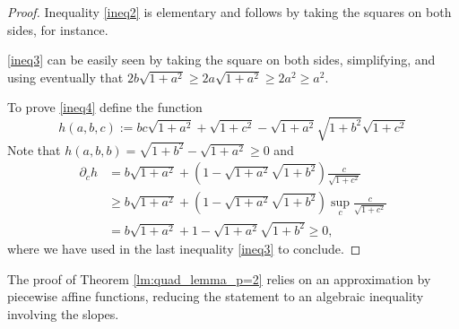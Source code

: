 \documentclass[10pt,leqno]{amsart}
\newcommand{\p}{\partial}
\numberwithin{Theorem}{section}
\theoremstyle{definition}
\theoremstyle{remark}
\numberwithin{equation}{section}
\numberwithin{equation}{section}
\begin{document}
\begin{proof}
Inequality \eqref{ineq2} is elementary and follows by taking the squares on both sides, for instance.

\eqref{ineq3} can be easily seen by taking the square on both sides, simplifying, and using eventually  that $2b\sqrt{1+a^2}\geq 2a\sqrt{1+a^2}\geq 2a^2\geq a^2.$

To prove \eqref{ineq4} define the function
\[
h(a,b,c):= bc \sqrt{1+a^2} +\sqrt{1+c^2}-\sqrt{1+a^2} \sqrt{1+b^2}\sqrt{1+c^2}
\]
Note that $h(a,b,b) = \sqrt{1+b^2}-\sqrt{1+a^2} \geq 0$ and
\begin{align*}
    \p_c h &= b\sqrt{1+a^2} + (1-\sqrt{1+a^2}\sqrt{1+b^2}) \frac{c}{\sqrt{1+c^2}}  \\
    &\geq b\sqrt{1+a^2} + (1-\sqrt{1+a^2}\sqrt{1+b^2}) \sup_{c}\frac{c}{\sqrt{1+c^2}} \\
    &= b\sqrt{1+a^2} + 1-\sqrt{1+a^2}\sqrt{1+b^2} \geq 0,
\end{align*}
where we have used in the last inequality \eqref{ineq3} to conclude.
\end{proof}

The proof of Theorem \ref{lm:quad_lemma_p=2} relies on an approximation by piecewise affine functions, reducing the statement to an algebraic inequality involving the slopes. 
\end{document}

